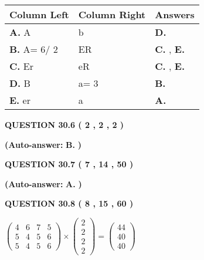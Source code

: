\documentclass[12pt]{article}
\begin{document}
 
\noindent{}
  
  
\begin{tabular}{|l|l|l|}
 \hline
 Column Left & Column Right  & Answers       \\ 
 \hline
{\textbf{\large{
A.}}}
A
  & 
b
 & 
{\textbf{\large{
D.}}}
 \\ 
 \hline
{\textbf{\large{
B.}}}
 A= %
6/ %
2

  & 
ER
 & 
{\textbf{\large{
C.}}}
, 
{\textbf{\large{
E.}}}
 \\ 
 \hline
{\textbf{\large{
C.}}}
Er
  & 
eR
 & 
{\textbf{\large{
C.}}}
, 
{\textbf{\large{
E.}}}
 \\ 
 \hline
{\textbf{\large{
D.}}}
B
  & 
 a= %
3
 & 
{\textbf{\large{
B.}}}
 \\ 
 \hline
{\textbf{\large{
E.}}}
er
  & 
a
 & 
{\textbf{\large{
A.}}}
 \\ 
 \hline
 \end{tabular}
  
  
\noindent{}
 
 
  
  
{\textbf{\large{QUESTION
30.6 
 (           2 ,           2 ,           2 )
}}}
 
 
{\textbf{(Auto-answer:}}
{\textbf{\large{
B.}}}
{\textbf{)}}
 
 
  
  
{\textbf{\large{QUESTION
30.7 
 (           7 ,          14 ,          50 )
}}}
 
 
{\textbf{(Auto-answer:}}
{\textbf{\large{
A.}}}
{\textbf{)}}
 
 
  
  
{\textbf{\large{QUESTION
30.8 
 (           8 ,          15 ,          60 )
}}}

 
$\left( \begin{array}{ccccccccccccccc}
           4  & 
           6  & 
           7  & 
           5  \\ 
           5  & 
           4  & 
           5  & 
           6  \\ 
           5  & 
           4  & 
           5  & 
           6
\end{array}\right) \times
\left( \begin{array}{c}
           2  \\ 
           2  \\ 
           2  \\ 
           2
\end{array}\right)  =
\left( \begin{array}{c}
          44  \\ 
          40  \\ 
          40
\end{array}\right)  $
 
\end{document}

